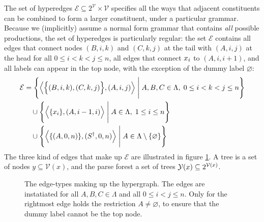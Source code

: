     The set of hyperedges $\mathcal{E} \subseteq 2^{\mathcal{V}} \times \mathcal{V}$ specifies all the ways that adjacent constituents can be combined to form a larger constituent, under a particular grammar. Because we (implicitly) assume a normal form grammar that contains \textit{all} possible productions, the set of hyperedges is particularly regular: the set $\mathcal{E}$ contains all edges that connect nodes $(B, i, k)$ and $(C, k, j)$ at the tail with $(A, i, j)$ at the head for all $0 \leq i < k < j \leq n$, all edges that connect $\x_i$ to $(A, i, i+1)$, and all labels can appear in the top node, with the exception of the dummy label $\varnothing$:
    \begin{align*}
      \mathcal{E}
        &= \Bigg\{ \Big\langle \Big\{ (B, i, k), (C, k, j) \Big\},  (A, i, j) \Big\rangle \; \Bigg\vert \; A, B, C \in \Lambda, \; 0 \leq i < k < j \leq n \Bigg\}  \\
        &\quad\cup \Bigg\{ \Big\langle \{ \x_i \}, (A, i-1, i) \Big\rangle \; \Bigg\vert \; A \in \Lambda, \; 1 \leq i \leq n \Bigg\}  \\
        &\quad\cup \Bigg\{ \Big\langle \{ (A, 0, n) \}, (S^{\dagger}, 0, n) \Big\rangle \; \Bigg\vert \; A \in \Lambda \setminus \{ \varnothing \} \Bigg\}
    \end{align*}
    The three kind of edges that make up $\mathcal{E}$ are illustrated in figure \ref{fig:crf-edges}. A tree is a set of nodes $y \subseteq \mathcal{V}(x)$, and the parse forest a set of trees $\yieldx \subseteq 2^{\mathcal{V}(x)}$.

    \begin{figure}[h]
      \center
      \begin{tikzpicture}[scale=.6]
        
      \end{tikzpicture}
      \caption{The edge-types making up the hypergraph. The edges are instatiated for all $A, B, C \in \Lambda$ and all $0 \leq i < j \leq n$. Only for the rightmost edge holds the restriction $A \neq \varnothing$, to ensure that the dummy label cannot be the top node.}
      \label{fig:crf-edges}
    \end{figure}

